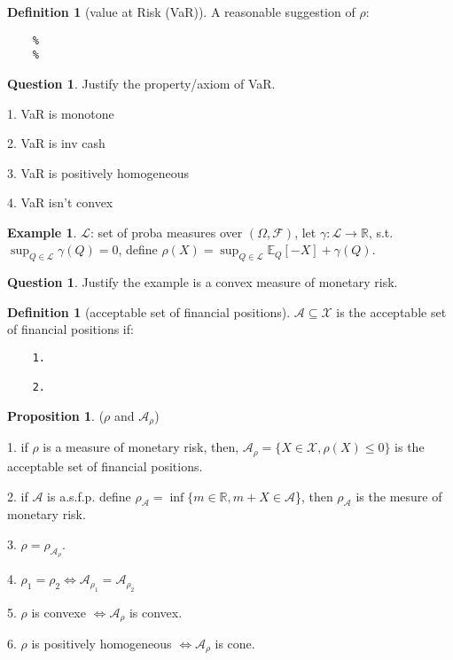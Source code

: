 \documentclass[letterpaper, 11pt]{article}
\let\mc\mathcal
\newcommand{\R}{\mathbb{R}}   %
\newcommand{\E}{\mathbb{E}}     %
\newcommand{\1}{\mathds{1}}	%
\theoremstyle{definition}
\newtheorem{proposition}[theorem]{Proposition}
\newtheorem{definition}[theorem]{Definition}
\newtheorem{example}[theorem]{Example}
\newtheorem{question}[theorem]{Question}
\begin{document}
\begin{definition}[value at Risk (VaR)]
    A reasonable suggestion of $\rho$:
\end{definition}
\begin{lstlisting}
    %
    %
\end{lstlisting}
\begin{question}
    Justify the property/axiom of VaR.

    1. VaR is monotone
    
    2. VaR is inv cash

    3. VaR is positively homogeneous

    4. VaR isn't convex
\end{question}

\begin{example}
    $\mc{L}$: set of proba measures over $(\Omega,\mc{F})$, let $\gamma:\mc{L} \rightarrow \R$, s.t. 
    $\sup_{Q\in \mc{L}} \gamma(Q) = 0$, define
    $\rho(X) = \sup_{Q\in \mc{L}} \E_{Q}[-X]+\gamma(Q)$.
\end{example}
\begin{question}
    Justify the example is a convex measure of monetary risk. 
\end{question}

\begin{definition}[acceptable set of financial positions]
    $\mc{A} \subseteq \mc{X}$ is the acceptable set of financial positions if:
\end{definition}
\begin{lstlisting}
    1.

    2.
\end{lstlisting}

\begin{proposition}{($\rho$ and $\mc{A}_{\rho}$)}

    1. if $\rho$ is a measure of monetary risk, then,
    $\mc{A}_{\rho} = \{ X\in \mc{X}, \rho(X) \leq 0\}$ is the acceptable set of financial positions.

    2. if $\mc{A}$ is a.s.f.p. define $\rho_{\mc{A}} = \inf\{ m \in \R, m+X \in \mc{A}$\}, then $\rho_{\mc{A}}$ is the mesure of monetary risk.

    3. $\rho = \rho_{\mc{A}_{\rho}}$.

    4. $\rho_{1}=\rho_{2} \iff \mc{A}_{\rho_{1}} = \mc{A}_{\rho_{2}}$

    5. $\rho$ is convexe $\iff \mc{A}_{\rho}$ is convex.

    6.  $\rho$ is positively homogeneous $\iff \mc{A}_{\rho}$ is cone.
\end{proposition}
\end{document}
